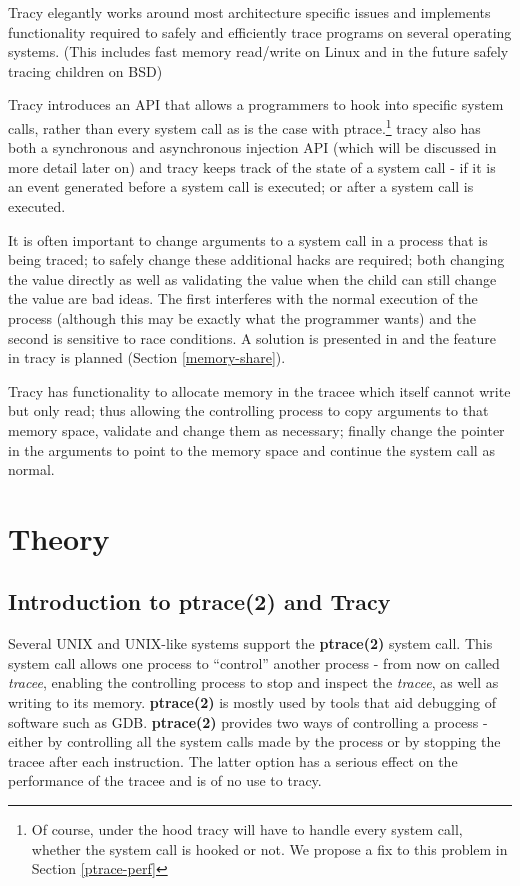 \documentclass[a4paper, 10pt]{report}
\begin{document}
Tracy elegantly works around most architecture specific issues and implements
functionality required to safely and efficiently trace programs on several
operating systems. (This includes fast memory read/write on Linux
and in the future safely tracing children on BSD)

Tracy introduces an API that allows a programmers to hook into specific system
calls, rather than every system call as is the case with ptrace.\footnote{Of
course, under the hood tracy will have to handle every system call, whether
the system call is hooked or not. We propose a fix to this problem in
Section \ref{ptrace-perf}} tracy also has both a synchronous and asynchronous
injection API (which will be discussed in more detail later on) and tracy keeps
track of the state of a system call - if it is an event generated before a
system call is executed; or after a system call is executed.

It is often important to change arguments to a system call in a process that is
being traced; to safely change these additional hacks are required;
both changing the value directly as well as validating the value when the child
can still change the value are bad ideas.
The first interferes with the normal execution of the process
(although this may be exactly what the programmer wants) and the second is
sensitive to race conditions. A solution is presented in
\cite{Noordende_asecure} and the feature in tracy is planned (Section
\ref{memory-share}).

Tracy has functionality to allocate memory in the
tracee which itself cannot write but only read; thus allowing the controlling
process to copy arguments to that memory space, validate and change them as
necessary; finally change the pointer in the arguments to point to the memory
space and continue the system call as normal.

\chapter{Theory}

\section{Introduction to ptrace(2) and Tracy}

Several UNIX and UNIX-like systems support the \textbf{ptrace(2)} system call.
This system call allows one process to ``control'' another process - from now on
called \textit{tracee}, enabling the controlling process to stop and inspect
the \textit{tracee}, as well as writing to its memory. \textbf{ptrace(2)} is
mostly used by tools that aid debugging of software such as GDB\cite{gdb}.
\textbf{ptrace(2)} provides two ways of controlling a process
- either by controlling all the system calls made by the process or by stopping
the tracee after each instruction. The latter option has a serious effect on the
performance of the tracee and is of no use to tracy.
\end{document}
